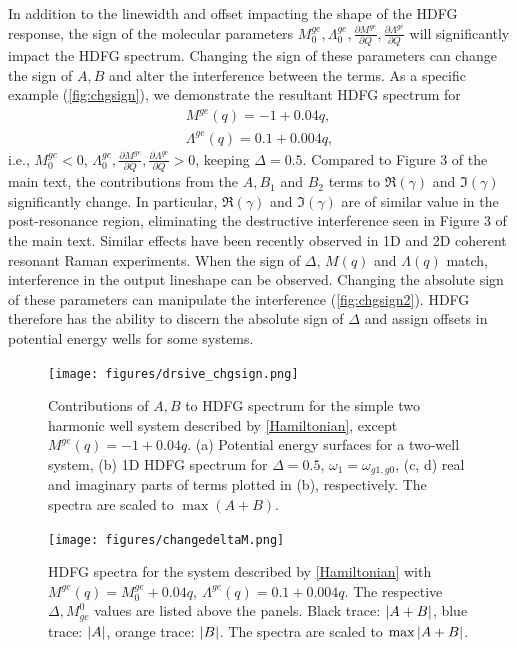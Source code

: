 \documentclass[aip, jcp, reprint, onecolumn, nofootinbib]{revtex4-2}
\begin{document}
In addition to the linewidth and offset impacting the shape of the HDFG response, the sign of the molecular parameters $M^{ge}_0, \Lambda^{ge}_0, \frac{\partial M^{ge}}{\partial Q} , \frac{\partial \Lambda^{ge}}{\partial Q}$ will significantly impact the HDFG spectrum.
Changing the sign of these parameters can change the sign of $A, B$ and alter the interference between the terms.  
As a specific example (\autoref{fig:chgsign}), we demonstrate the resultant HDFG spectrum for \begin{eqnarray}
	M^{ge}(q) = -1 + 0.04 q,  \\
	\Lambda^{ge}(q) = 0.1 + 0.004 q,
\end{eqnarray}
i.e., $M^{ge}_0 < 0$, $\Lambda^{ge}_0, \frac{\partial M^{ge}}{\partial Q} , \frac{\partial \Lambda^{ge}}{\partial Q} > 0$, keeping $\Delta = 0.5$.
Compared to Figure 3 of the main text, the contributions from the $A, B_1$ and $B_2$ terms to $\Re(\gamma)$ and $\Im(\gamma)$ significantly change.
In particular, $\Re(\gamma)$ and $\Im(\gamma)$ are of similar value in the post-resonance region, eliminating the destructive interference seen in Figure 3 of the main text.
Similar effects have been recently observed in 1D and 2D coherent resonant Raman experiments.\cite{Fumero2020, Batignani2022}
When the sign of $\Delta$, $M(q)$ and $\Lambda(q)$ match, interference in the output lineshape can be observed.
Changing the absolute sign of these parameters can manipulate the interference (\autoref{fig:chgsign2}).
HDFG therefore has the ability to discern the absolute sign of $\Delta$ and assign offsets in potential energy wells for some systems.

\begin{figure}[!htbp]
	\centering
	\texttt{[image: figures/drsive\_chgsign.png]}
	\caption{Contributions of $A, B$ to HDFG spectrum for the simple two harmonic well system described by \autoref{Hamiltonian}, except $M^{ge}(q) = -1 + 0.04 q$.
		(a) Potential energy surfaces for a two-well system, (b) 1D HDFG spectrum for $\Delta = 0.5$, $\omega_1 = \omega_{g1, g0}$, (c, d) real and imaginary parts of terms plotted in (b), respectively.
		The spectra are scaled to $\max{(A+B)}$. 
} 
	\label{fig:chgsign}
\end{figure}

\begin{figure}[!htbp]
	\centering
	\texttt{[image: figures/changedeltaM.png]}
	\caption{HDFG spectra for the system described by \autoref{Hamiltonian} with $M^{ge}(q) = M^{ge}_0 + 0.04 q,\ \Lambda^{ge}(q) = 0.1 + 0.004 q$. 
	The respective $\Delta, M^{0}_{ge}$ values are listed above the panels.
	Black trace: $\abs{A+B}$, blue trace: $\abs{A}$, orange trace: $\abs{B}$.
	The spectra are scaled to $\max{\abs{A+B}}$. 
	} 
	\label{fig:chgsign2}
\end{figure}
\newpage
\end{document}
